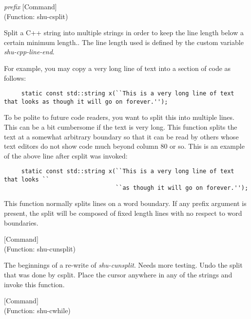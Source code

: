 \vspace{1em}
\noindent
{}
\usebox{\funcname}\emph{prefix}
 \hfill [Command]\\%
 (Function: shu-csplit)

\begin{doc-string}
Split a C++ string into multiple strings in order to keep the line length
below a certain minimum length..  The line length used is defined by the custom
variable \emph{shu-cpp-line-end}.

For example, you may copy a very long line of text into a section of code as
follows:

\small{\begin{verbatim}
     static const std::string x(``This is a very long line of text that looks as though it will go on forever.'');
\end{verbatim}}

To be polite to future code readers, you want to split this into multiple lines.
This can be a bit cumbersome if the text is very long.  This function splits the
text at a somewhat arbitrary boundary so that it can be read by others whose
text editors do not show code much beyond column 80 or so.  This is an example
of the above line after csplit was invoked:

\small{\begin{verbatim}
     static const std::string x(``This is a very long line of text that looks ``
                                ``as though it will go on forever.'');
\end{verbatim}}

This function normally splits lines on a word boundary.  If any prefix argument
is present, the split will be composed of fixed length lines with no respect to
word boundaries.
\end{doc-string}

\vspace{1em}
\noindent
{}
\usebox{\funcname}
 \hfill [Command]\\%
 (Function: shu-cunsplit)

\begin{doc-string}
The beginnings of a re-write of \emph{shu-cunsplit}.
Needs more testing.
Undo the split that was done by csplit.  Place the cursor anywhere
in any of the strings and invoke this function.
\end{doc-string}

\vspace{1em}
\noindent
{}
\usebox{\funcname}
 \hfill [Command]\\%
 (Function: shu-cwhile)

